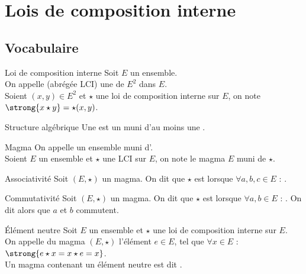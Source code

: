 \documentclass[12pt,a4paper]{report}
\begin{document}
\section{Lois de composition interne}

    \subsection{Vocabulaire}
    
    \begin{definition}{Loi de composition interne}{}
    Soit $E$ un ensemble.\\
    On appelle  (abrégée LCI) une  de $E^2$ dans $E$.\\
    Soient $(x, y) \in E^2$ et $\star$ une loi de composition interne sur $E$, on note $\strong{x \star y} = \star(x ,y)$.
    \end{definition}
    
    \begin{definition}{Structure algébrique}{}
    Une  est un  muni d'au moins une .
    \end{definition}
    
    \begin{definition}{Magma}{}
    On appelle  un ensemble muni d'.\\
    Soient $E$ un ensemble et $\star$ une LCI sur $E$, on note  le magma $E$ muni de $\star$.
    \end{definition}
    
    \begin{definition}{Associativité}{}
    Soit $(E, \star)$ un magma. On dit que $\star$ est  lorsque $\forall a, b, c \in E$ : .
    \end{definition}
    
    \begin{definition}{Commutativité}{}
    Soit $(E, \star)$ un magma. On dit que $\star$ est  lorsque $\forall a, b \in E$ : . On dit alors que $a$ et $b$ commutent.
    \end{definition}
    
    \begin{definition}{Élément neutre}{}
    Soit $E$ un ensemble et $\star$ une loi de composition interne sur $E$.\\
    On appelle  du magma $(E, \star)$ l'élément $e \in E$, tel que $\forall x \in E$ : $\strong{e \star x = x \star e = x}$.\\
    Un magma contenant un élément neutre est dit .
    \end{definition}
    
\end{document}
